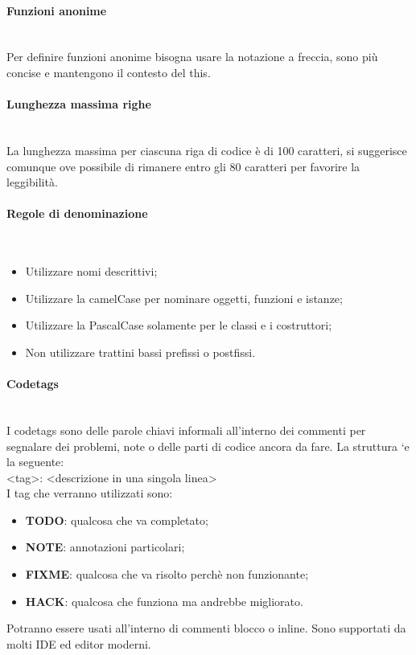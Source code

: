 \paragraph{Funzioni anonime}\mbox{}\\
Per definire funzioni anonime bisogna usare la notazione a freccia, sono più concise e
mantengono il contesto del {this}.

\paragraph{Lunghezza massima righe}\mbox{}\\
La lunghezza massima per ciascuna riga di codice è di 100 caratteri, si suggerisce comunque
ove possibile di rimanere entro gli 80 caratteri per favorire la leggibilità.

\paragraph{Regole di denominazione}\mbox{}\\
\begin{itemize}
\item Utilizzare nomi descrittivi;
\item Utilizzare la camelCase per nominare oggetti, funzioni e istanze;
\item Utilizzare la PascalCase solamente per le classi e i costruttori;
\item Non utilizzare trattini bassi prefissi o postfissi.
\end{itemize}

\paragraph{Codetags}\mbox{}\\
I codetags sono delle parole chiavi informali all'interno dei commenti per segnalare
dei problemi, note o delle parti di codice ancora da fare. La struttura `e la seguente: \\
<tag>: <descrizione in una singola linea>\\
I tag che verranno utilizzati sono:
\begin{itemize}
\item \textbf{TODO}: qualcosa che va completato;
\item \textbf{NOTE}: annotazioni particolari;
\item \textbf{FIXME}: qualcosa che va risolto perchè non funzionante;
\item \textbf{HACK}: qualcosa che funziona ma andrebbe migliorato.
\end{itemize}
Potranno essere usati all’interno di commenti blocco o inline. Sono supportati da
molti IDE ed editor moderni.

